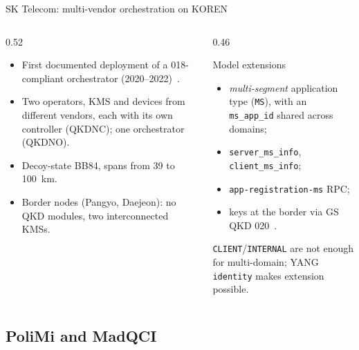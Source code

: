 \documentclass[10pt]{beamer}
\begin{document}
\begin{frame}{SK Telecom: multi-vendor orchestration on KOREN}
  \begin{columns}[T]
    \begin{column}{0.52\textwidth}
      \begin{itemize}\small
        \item First documented deployment of a 018-compliant
              orchestrator (2020–2022)~\cite{sim2023}.
        \item Two operators, KMS and devices from different vendors, each
              with its own controller (QKDNC); one orchestrator (QKDNO).
        \item Decoy-state BB84, spans from 39 to 100~km.
        \item \alert{Border nodes} (Pangyo, Daejeon): no QKD modules, two
              interconnected KMSs.
      \end{itemize}
    \end{column}
    \begin{column}{0.46\textwidth}
      \begin{block}{Model extensions}
        \small
        \begin{itemize}
          \item \emph{multi-segment} application type (\texttt{MS}),
                with an \texttt{ms\_app\_id} shared across domains;
          \item \texttt{server\_ms\_info}, \texttt{client\_ms\_info};
          \item \texttt{app-registration-ms} RPC;
          \item keys at the border via GS QKD 020~\cite{qkd020}.
        \end{itemize}
      \end{block}
      \footnotesize \texttt{CLIENT}/\texttt{INTERNAL} are not enough for
      multi-domain; YANG \texttt{identity} makes extension possible.
    \end{column}
  \end{columns}
\end{frame}

\subsection{PoliMi and MadQCI}
\end{document}
